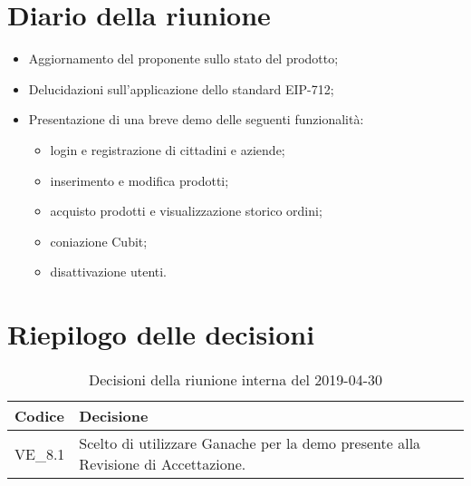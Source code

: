 \section{Diario della riunione}
\begin{itemize}
	\item Aggiornamento del proponente sullo stato del prodotto;
	\item Delucidazioni sull'applicazione dello standard EIP-712;
	\item Presentazione di una breve demo delle seguenti funzionalità:
	\begin{itemize}
		\item login e registrazione di cittadini e aziende;
		\item inserimento e modifica prodotti;
		\item acquisto prodotti e visualizzazione storico ordini;
		\item coniazione Cubit;
		\item disattivazione utenti.
	\end{itemize}
\end{itemize}

\hspace{3cm}

\section{Riepilogo delle decisioni}

	
	\begin{longtable}{ >{\centering}p{} >{}p{}}
		\caption{Decisioni della riunione interna del 2019-04-30}\\	
		\rowcolorhead
		\textbf{\color{white}Codice} 
		& \centering\textbf{\color{white}Decisione} 
		\tabularnewline 
		\endfirsthead
		VE\_8.1 & Scelto di utilizzare Ganache per la demo presente alla Revisione di 
		Accettazione.
		
		
	\end{longtable}
	




